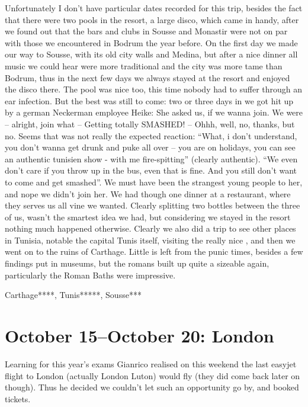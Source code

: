 Unfortunately I don't have particular dates recorded for this trip, besides the fact that there were two pools in the resort, a large disco, which came in handy, after we found out that the bars and clubs in Sousse and Monastir were not on par with those we encountered in Bodrum the year before. On the first day we made our way to Sousse, with its old city walls and Medina, but after a nice dinner all music we could hear were more traditional and the city was more tame than Bodrum, thus in the next few days we always stayed at the resort and enjoyed the disco there. The pool was nice too, this time nobody had to suffer through an ear infection. But the best was still to come: two or three days in we got hit up by a german Neckerman employee Heike: She asked us, if we wanna join. We were -- alright, join what -- Getting totally SMASHED! -- Ohhh, well, no, thanks, but no. Seems that was not really the expected reaction: ``What, i don't understand, you don't wanna get drunk and puke all over -- you are on holidays, you can see an authentic tunisien show - with me fire-spitting'' (clearly authentic). ``We even don't care if you throw up in the bus, even that is fine. And you still don't want to come and get smashed''. We must have been the strangest young people to her, and nope we didn't join her. We had though one dinner at a restaurant, where they serves us all vine we wanted. Clearly splitting two bottles between the three of us, wasn't the smartest idea we had, but considering we stayed in the resort nothing much happened otherwise. Clearly we also did a trip to see other places in Tunisia, notable the capital Tunis itself, visiting the really nice , and then we went on to the ruins of Carthage. Little is left from the punic times, besides a few findings put in museums, but the romans built up quite a sizeable again, particularly the Roman Baths were impressive.

Carthage****, Tunis*****, Sousse***

\section{October 15--October 20: London}
\label{2004:London}

Learning for this year's exams Gianrico realised on this weekend the last easyjet flight to London (actually London Luton) would fly (they did come back later on though). Thus he decided we couldn't let such an opportunity go by, and booked tickets.\\

